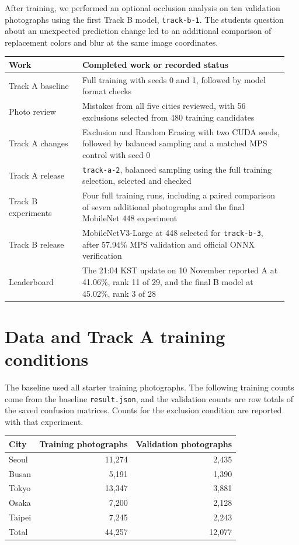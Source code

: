 \documentclass[11pt]{article}
\begin{document}
After training, we performed an optional occlusion analysis on ten validation
photographs using the first Track B model, \texttt{track-b-1}. The student\textquotesingle{}s question about an
unexpected prediction change led to an additional comparison of replacement
colors and blur at the same image coordinates.

\begin{center}\small
\begin{tabular}{@{}p{0.25\linewidth}p{0.70\linewidth}@{}}
\toprule
Work & Completed work or recorded status \\
\midrule
Track A baseline & Full training with seeds 0 and 1, followed by model format checks \\
Photo review & Mistakes from all five cities reviewed, with 56 exclusions selected from 480 training candidates \\
Track A changes & Exclusion and Random Erasing with two CUDA seeds, followed by balanced sampling and a matched MPS control with seed 0 \\
Track A release & \texttt{track-a-2}, balanced sampling using the full training selection, selected and checked \\
Track B experiments & Four full training runs, including a paired comparison of seven additional photographs and the final MobileNet 448 experiment \\
Track B release & MobileNetV3-Large at 448 selected for \texttt{track-b-3}, after 57.94\% MPS validation and official ONNX verification \\
Leaderboard & The 21:04 KST update on 10 November reported A at 41.06\%, rank 11 of 29, and the final B model at 45.02\%, rank 3 of 28 \\
\bottomrule
\end{tabular}
\end{center}

\section{Data and Track A training conditions}

The baseline used all starter training photographs. The following training
counts come from the baseline \texttt{result.json}, and the validation counts
are row totals of the saved confusion matrices. Counts for the exclusion
condition are reported with that experiment.

\begin{center}\small
\begin{tabular}{lrr}
\toprule
City & Training photographs & Validation photographs \\
\midrule
Seoul & 11,274 & 2,435 \\
Busan & 5,191 & 1,390 \\
Tokyo & 13,347 & 3,881 \\
Osaka & 7,200 & 2,128 \\
Taipei & 7,245 & 2,243 \\
\midrule
Total & 44,257 & 12,077 \\
\bottomrule
\end{tabular}
\end{center}
\end{document}
